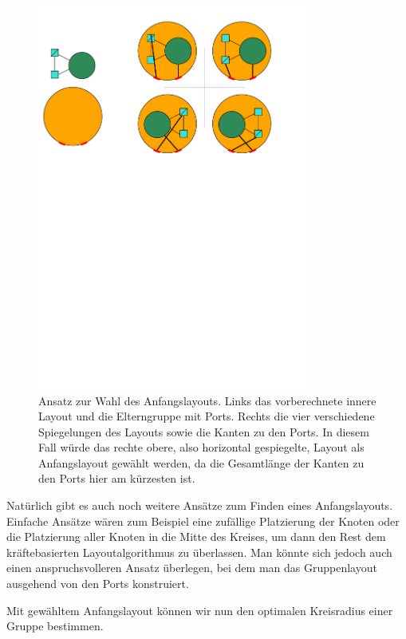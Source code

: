 \begin{figure}[h!]
\begin{center} 
  \includegraphics[width=0.8\textwidth]{Pics/Anfangslayout.pdf}
  \caption{Ansatz zur Wahl des Anfangslayouts. Links das vorberechnete innere Layout und die Elterngruppe mit Ports. Rechts die vier verschiedene Spiegelungen des Layouts sowie die Kanten zu den Ports.
  In diesem Fall würde das rechte obere, also horizontal gespiegelte, Layout als Anfangslayout gewählt werden, da die Gesamtlänge der Kanten zu den Ports hier am kürzesten ist.}
  \label{f:Anfangslayout}
\end{center}
\end{figure}

Natürlich gibt es auch noch weitere Ansätze zum Finden eines Anfangslayouts.
Einfache Ansätze wären zum Beispiel eine zufällige Platzierung der Knoten oder die Platzierung aller Knoten in die Mitte des Kreises, 
um dann den Rest dem kräftebasierten Layoutalgorithmus zu überlassen. 
Man könnte sich jedoch auch einen anspruchsvolleren Ansatz überlegen, bei dem man das Gruppenlayout ausgehend von den Ports konstruiert.

Mit gewähltem Anfangslayout können wir nun den optimalen Kreisradius einer Gruppe bestimmen.

